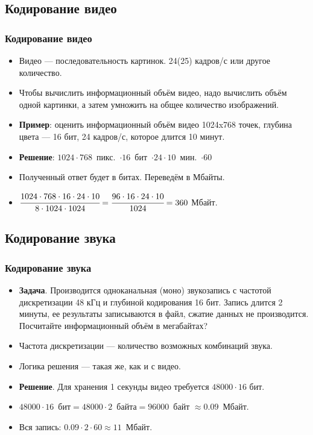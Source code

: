 \documentclass[compress,red]{beamer}
\begin{document}
\subsection{Кодирование видео}
\begin{frame}[fragile]
  \frametitle{Кодирование видео}
  \begin{itemize}[<+->]
    \item Видео --- последовательность картинок. 24(25) кадров/с или другое количество.
    \item Чтобы вычислить информационный объём видео, надо вычислить объём одной картинки, а затем умножить на общее количество изображений.
    \item \textbf{Пример}: оценить информационный объём видео 1024x768 точек, глубина цвета --- 16 бит, 24 кадров/с, которое длится 10 минут.
    \item \textbf{Решение}: $1024\cdot 768$~пикс.~$\cdot 16$~бит~$\cdot 24\cdot 10$~мин.~$\cdot 60$
    \item Полученный ответ будет в битах. Переведём в Мбайты.
    \item $\cfrac{1024\cdot 768\cdot 16\cdot 24\cdot 10}{8\cdot 1024\cdot 1024} = \cfrac{96\cdot 16\cdot 24\cdot 10}{1024} = 360$ Мбайт.
  \end{itemize}
\end{frame}

\subsection{Кодирование звука}
\begin{frame}[fragile]
  \frametitle{Кодирование звука}
  \begin{itemize}[<+->]
    \item \textbf{Задача}. Производится одноканальная (моно) звукозапись с частотой дискретизации 48 кГц и глубиной кодирования 16 бит. Запись длится 2 минуты, ее результаты записываются в файл, сжатие данных не производится. Посчитайте информационный объём в мегабайтах?
    \item Частота дискретизации --- количество возможных комбинаций звука.
    \item Логика решения --- такая же, как и с видео.
    \item \textbf{Решение}. Для хранения 1 секунды видео требуется $48000\cdot 16$ бит.
    \item $48000\cdot 16$~бит$=48000\cdot 2$~байта$=96000$~байт $\approx 0.09$~Мбайт.
    \item Вся запись: $0.09\cdot 2\cdot 60 \approx 11$~Мбайт. 
  \end{itemize}
\end{frame}
\end{document}
